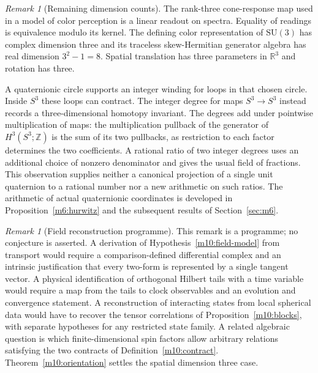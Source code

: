 \documentclass[11pt,reqno]{amsart}
\theoremstyle{definition}
\theoremstyle{remark}
\newtheorem{remark}[theorem]{Remark}
\numberwithin{equation}{section}
\newcommand{\R}{\mathbb{R}}
\newcommand{\SU}{\mathrm{SU}}
\begin{document}
\begin{remark}[Remaining dimension counts]\label{m10:interpretations}
The rank-three cone-response map used in a model of color
perception is a linear readout on spectra. Equality of readings
is equivalence modulo its kernel. The defining color
representation of \(\SU(3)\) has complex dimension three and
its traceless skew-Hermitian generator algebra has real
dimension \(3^2-1=8\). Spatial translation has three parameters
in \(\R^3\) and rotation has three.

A quaternionic circle supports an integer winding for loops in
that chosen circle. Inside \(S^3\) these loops can contract.
The integer degree for maps \(S^3\to S^3\) instead records a
three-dimensional homotopy invariant. The degrees add under
pointwise multiplication of maps: the multiplication
pullback of the generator of \(H^3(S^3;\mathbb Z)\) is the
sum of its two pullbacks, as restriction to each factor
determines the two coefficients. A rational ratio of two
integer degrees uses an additional choice of nonzero
denominator and gives the usual field of fractions. This
observation supplies neither a canonical projection of a
single unit quaternion to a rational number nor a new
arithmetic on such ratios. The arithmetic of actual
quaternionic coordinates is developed in
Proposition~\ref{m6:hurwitz} and the subsequent results of
Section~\ref{sec:m6}.
\end{remark}

\begin{remark}[Field reconstruction programme]\label{m10:programme}
This remark is a programme; no conjecture is asserted.
A derivation of Hypothesis~\ref{m10:field-model} from transport
would require a comparison-defined differential complex and
an intrinsic justification that every two-form is represented
by a single tangent vector. A physical identification of
orthogonal Hilbert tails with a time variable would require a
map from the tails to clock observables and an evolution and
convergence statement. A reconstruction of interacting states
from local spherical data would have to recover the tensor
correlations of Proposition~\ref{m10:blocks}, with separate
hypotheses for any restricted state family.
A related algebraic question is which finite-dimensional spin
factors allow arbitrary relations satisfying the two contracts
of Definition~\ref{m10:contract}. Theorem~\ref{m10:orientation}
settles the spatial dimension three case.
\end{remark}

\setcounter{section}{5}
\renewcommand{\thesection}{\arabic{section}}
\renewcommand{\theHsection}{\arabic{section}}
\end{document}
